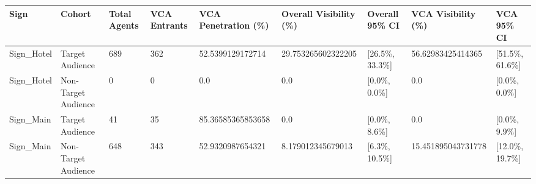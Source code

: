 \begin{tabular}{lllllllll}
\hline
Sign & Cohort & Total Agents & VCA Entrants & VCA Penetration (\%) & Overall Visibility (\%) & Overall 95\% CI & VCA Visibility (\%) & VCA 95\% CI \\ \hline
Sign\_Hotel & Target Audience & 689 & 362 & 52.5399129172714 & 29.753265602322205 & [26.5\%, 33.3\%] & 56.62983425414365 & [51.5\%, 61.6\%] \\
Sign\_Hotel & Non-Target Audience & 0 & 0 & 0.0 & 0.0 & [0.0\%, 0.0\%] & 0.0 & [0.0\%, 0.0\%] \\
Sign\_Main & Target Audience & 41 & 35 & 85.36585365853658 & 0.0 & [0.0\%, 8.6\%] & 0.0 & [0.0\%, 9.9\%] \\
Sign\_Main & Non-Target Audience & 648 & 343 & 52.9320987654321 & 8.179012345679013 & [6.3\%, 10.5\%] & 15.451895043731778 & [12.0\%, 19.7\%] \\
\hline
\end{tabular}
